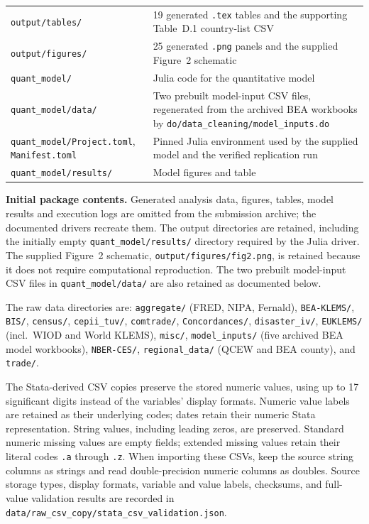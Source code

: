 \documentclass[11pt]{article}
\newcommand{\pkgfile}[1]{\nolinkurl{#1}}
\begin{document}
\begin{longtable}{@{}p{5.4cm}p{9.4cm}@{}}
\pkgfile{output/tables/} & 19 generated \texttt{.tex} tables and the supporting Table~D.1 country-list CSV\\
\pkgfile{output/figures/} & 25 generated \texttt{.png} panels and the supplied Figure~2 schematic\\
\pkgfile{quant_model/} & Julia code for the quantitative model\\
\pkgfile{quant_model/data/} & Two prebuilt model-input CSV files, regenerated from the archived BEA workbooks by \pkgfile{do/data_cleaning/model_inputs.do}\\
\pkgfile{quant_model/Project.toml}, \pkgfile{Manifest.toml} & Pinned Julia environment used by the supplied model and the verified replication run\\
\pkgfile{quant_model/results/} & Model figures and table\\
\bottomrule
\end{longtable}

\noindent\textbf{Initial package contents.}
Generated analysis data, figures, tables, model results and execution logs
are omitted from the submission archive; the documented drivers recreate
them. The output directories are retained, including the initially empty
\pkgfile{quant_model/results/} directory required by the Julia driver.
The supplied Figure~2 schematic, \pkgfile{output/figures/fig2.png}, is
retained because it does not require computational reproduction. The two
prebuilt model-input CSV files in \pkgfile{quant_model/data/} are also
retained as documented below.

\noindent The raw data directories are:
\pkgfile{aggregate/} (FRED, NIPA, Fernald),
\pkgfile{BEA-KLEMS/}, \pkgfile{BIS/}, \pkgfile{census/},
\pkgfile{cepii_tuv/}, \pkgfile{comtrade/}, \pkgfile{Concordances/},
\pkgfile{disaster_iv/}, \pkgfile{EUKLEMS/} (incl.\ WIOD and World KLEMS),
\pkgfile{misc/}, \pkgfile{model_inputs/} (five archived BEA model workbooks),
\pkgfile{NBER-CES/}, \pkgfile{regional_data/}
(QCEW and BEA county), and \pkgfile{trade/}.

\noindent The Stata-derived CSV copies preserve the stored numeric values,
using up to 17 significant digits instead of the variables' display formats.
Numeric value labels are retained as their underlying codes; dates retain their
numeric Stata representation. String values, including leading zeros, are
preserved. Standard numeric missing values are empty fields; extended missing
values retain their literal codes \texttt{.a} through \texttt{.z}.
When importing these CSVs, keep the source string columns as strings and
read double-precision numeric columns as doubles. Source storage types,
display formats, variable and value labels, checksums, and full-value
validation results are recorded in
\pkgfile{data/raw_csv_copy/stata_csv_validation.json}.
\end{document}

